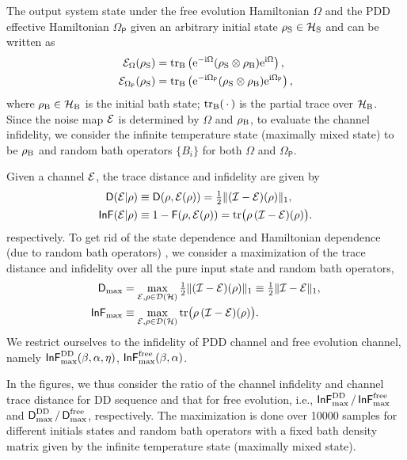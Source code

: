 \documentclass[aps,pra,reprint,superscriptaddress]{revtex4-2}
\newcommand{\Opdd}{\Omega_{\mathsf{P}}}
\begin{document}
The output system state under the free evolution Hamiltonian $\Omega$ and the PDD effective Hamiltonian $\Opdd$ given an arbitrary initial state $\rho_\mathrm{S}\in\mathcal{H}_{\mathrm{S}}$ and can be written as
\begin{align}\label{eq:output-rhos}
    \cE_{\Omega}(\rhoS) &= \trB  \left(
\upe^{-\upi \Omega} (\rhoS \otimes \rhoB) \upe^{\upi \Omega} \right), \\
    \cE_{\Opdd}(\rhoS) &= \trB  \left(
\upe^{-\upi \Opdd} (\rhoS \otimes \rhoB) \upe^{\upi \Opdd} \right),
\end{align}
where $\rho_\mathrm{B}\in\mathcal{H}_{\mathrm{B}}$ is the initial bath state; $\operatorname{\operatorname{tr}_\mathrm{B}}({\,\cdot\,})$ is the partial trace over $\mathcal{H}_{\mathrm{B}}$. Since the noise map $\mathcal{E}$ is determined by $\Omega$ and $\rho_\mathrm{B}$, to evaluate the channel infidelity, we consider the infinite temperature state (maximally mixed state) to be $\rho_\mathrm{B}$ and random bath operators $\{B_i\}$ for both $\Omega$ and $\Opdd$.


Given a channel $\mathcal{E}$, the trace distance and infidelity are given by
\begin{align}\label{eq:trd-def}
    \operatorname{\mathsf{D}}(\mathcal{E}|\rho) &\equiv \operatorname{\mathsf{D}}(\rho, \mathcal{E}(\rho)) = \tfrac{1}{2} \Vert { (\mathcal{I}-\mathcal{E}) (\rho)} \Vert_1, \\
    \operatorname{\mathsf{InF}}(\mathcal{E}|\rho) &\equiv 1- \operatorname{\mathsf{F}}(\rho, \mathcal{E}(\rho)) = \operatorname{tr}\bigl(\rho\, (\mathcal{I} -\mathcal{E})(\rho)\bigr).\label{eq:inf-def}
\end{align}
respectively. To get rid of the state dependence and Hamiltonian dependence (due to random bath operators) , we consider a maximization of the trace distance and infidelity over all the pure input state and random bath operators,
\begin{align}
    \operatorname{\mathsf{D}}_{\max} &= \max_{{\mathcal{E}}, \rho\in\mathcal{D}(\mathcal{H})} \tfrac{1}{2} \Vert { (\mathcal{I}- {\mathcal{E}}) (\rho)} \Vert_1 \equiv \tfrac{1}{2} \Vert { \mathcal{I}-\mathcal{E}} \Vert_1, \\
    \operatorname{\mathsf{InF}}_{\max} &\equiv \max_{ {\mathcal{E}},\rho\in\mathcal{D}(\mathcal{H})} \operatorname{tr}\bigl(\rho\, (\mathcal{I} -{\mathcal{E}})(\rho)\bigr).
\end{align}
We restrict ourselves to the infidelity of PDD channel and free evolution channel, namely $\operatorname{\mathsf{InF}}^{\rm DD}_{\rm max}(\beta, \alpha, \eta)$,  $\operatorname{\mathsf{InF}}^{\rm free}_{\rm max}(\beta, \alpha)$. 

In the figures, we thus consider the ratio of the channel infidelity and channel trace distance for DD sequence and that for free evolution, i.e., $\operatorname{\mathsf{InF}}^{\rm DD}_{\rm max} / \operatorname{\mathsf{InF}}^{\rm free}_{\rm max}$ and $\operatorname{\mathsf{D}}^{\rm DD}_{\rm max} / \operatorname{\mathsf{D}}^{\rm free}_{\rm max}$, respectively. The maximization is done over 10000 samples for different initials states and random bath operators with a fixed bath density matrix given by the infinite temperature state (maximally mixed state).  
\end{document}
